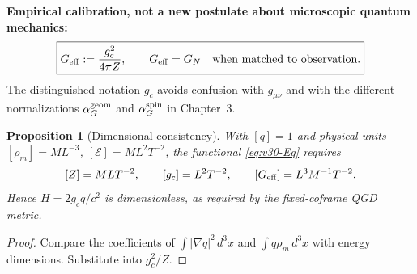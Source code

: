 \documentclass[11pt,a4paper]{article}
\newtheorem{proposition}[theorem]{Proposition}
\theoremstyle{remark}\newtheorem{remark}[theorem]{Remark}
\begin{document}
\noindent\textbf{Empirical calibration, not a new postulate about microscopic quantum mechanics:}
\begin{equation}\label{eq:v30-G}
\boxed{G_{\rm eff}:=\frac{g_c^2}{4\pi Z},\qquad G_{\rm eff}=G_N\quad\text{when matched to observation}.}
\end{equation}
The distinguished notation $g_c$ avoids confusion with $g_{\mu\nu}$ and with the different normalizations $\alpha_G^{\rm geom}$ and $\alpha_G^{\rm spin}$ in Chapter~3.

\begin{proposition}[Dimensional consistency]\label{prop:v30-units}
With $[q]=1$ and physical units $[\rho_m]=M L^{-3}$, $[\mathcal E]=ML^2T^{-2}$, the functional \eqref{eq:v30-Eq} requires
\begin{equation}\label{eq:v30-units}
[Z]=MLT^{-2},\qquad[g_c]=L^2T^{-2},\qquad[G_{\rm eff}]=L^3M^{-1}T^{-2}.
\end{equation}
Hence $H=2g_cq/c^2$ is dimensionless, as required by the fixed-coframe QGD metric.
\end{proposition}
\begin{proof} Compare the coefficients of $\int |\nabla q|^2\,d^3x$ and $\int q\rho_m\,d^3x$ with energy dimensions. Substitute into $g_c^2/Z$.\end{proof}
\end{document}
